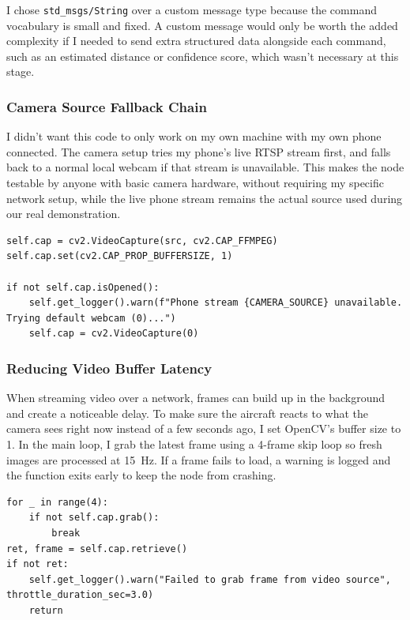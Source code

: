 \documentclass[12pt,a4paper]{article}
\begin{document}
I chose \texttt{std\_msgs/String} over a custom message type because the
command vocabulary is small and fixed. A custom message would only be
worth the added complexity if I needed to send extra structured data
alongside each command, such as an estimated distance or confidence
score, which wasn't necessary at this stage.

\subsubsection{Camera Source Fallback Chain}
I didn't want this code to only work on my own machine with my own
phone connected. The camera setup tries my phone's live RTSP stream
first, and falls back to a normal local webcam if that stream is
unavailable. This makes the node testable by anyone with basic camera
hardware, without requiring my specific network setup, while the live
phone stream remains the actual source used during our real
demonstration.

\begin{lstlisting}[style=pythonstyle, caption={Camera fallback: phone stream first, local webcam second.}]
self.cap = cv2.VideoCapture(src, cv2.CAP_FFMPEG)
self.cap.set(cv2.CAP_PROP_BUFFERSIZE, 1)

if not self.cap.isOpened():
    self.get_logger().warn(f"Phone stream {CAMERA_SOURCE} unavailable. Trying default webcam (0)...")
    self.cap = cv2.VideoCapture(0)
\end{lstlisting}

\subsubsection{Reducing Video Buffer Latency}
When streaming video over a network, frames can build up in the
background and create a noticeable delay. To make sure the aircraft
reacts to what the camera sees right now instead of a few seconds ago,
I set OpenCV's buffer size to 1. In the main loop, I grab the latest
frame using a 4-frame skip loop so fresh images are processed at
15~Hz. If a frame fails to load, a warning is logged and the function
exits early to keep the node from crashing.

\begin{lstlisting}[style=pythonstyle, caption={Grabbing the video frame and dropping buffer lag in perception\_publisher\_node.py.}]
for _ in range(4):
    if not self.cap.grab():
        break
ret, frame = self.cap.retrieve()
if not ret:
    self.get_logger().warn("Failed to grab frame from video source", throttle_duration_sec=3.0)
    return
\end{lstlisting}
\end{document}
